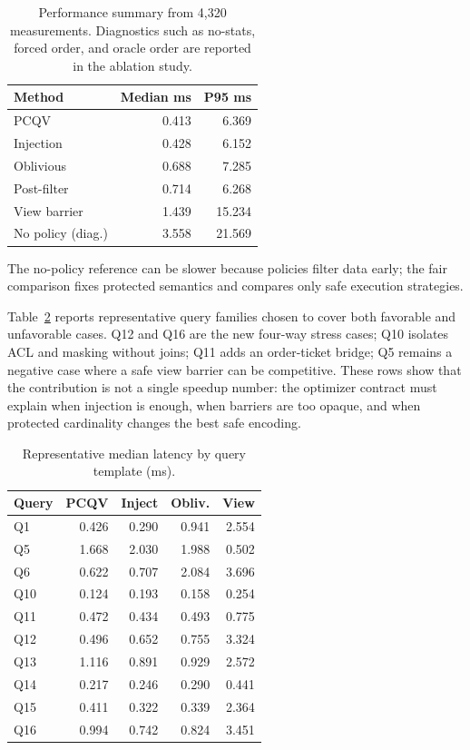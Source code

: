 \documentclass[conference]{IEEEtran}
\newcommand{\pcqv}{PCQV}
\begin{document}
\begin{table}[t]
\centering
\caption{Performance summary from 4,320 measurements. Diagnostics such as no-stats, forced order, and oracle order are reported in the ablation study.}
\label{tab:perf}
\begin{tabular}{lrr}
\toprule
Method & Median ms & P95 ms \\
\midrule
\pcqv{} & 0.413 & 6.369 \\
Injection & 0.428 & 6.152 \\
Oblivious & 0.688 & 7.285 \\
Post-filter & 0.714 & 6.268 \\
View barrier & 1.439 & 15.234 \\
No policy (diag.) & 3.558 & 21.569 \\
\bottomrule
\end{tabular}
\end{table}



The no-policy reference can be slower because policies filter data early; the fair comparison fixes protected semantics and compares only safe execution strategies.

Table~\ref{tab:byquery} reports representative query families chosen to cover both favorable and unfavorable cases. Q12 and Q16 are the new four-way stress cases; Q10 isolates ACL and masking without joins; Q11 adds an order-ticket bridge; Q5 remains a negative case where a safe view barrier can be competitive. These rows show that the contribution is not a single speedup number: the optimizer contract must explain when injection is enough, when barriers are too opaque, and when protected cardinality changes the best safe encoding.

\begin{table}[t]
\centering
\caption{Representative median latency by query template (ms).}
\label{tab:byquery}
\begin{tabular}{lrrrr}
\toprule
Query & \pcqv{} & Inject & Obliv. & View \\
\midrule
Q1 & 0.426 & 0.290 & 0.941 & 2.554 \\
Q5 & 1.668 & 2.030 & 1.988 & 0.502 \\
Q6 & 0.622 & 0.707 & 2.084 & 3.696 \\
Q10 & 0.124 & 0.193 & 0.158 & 0.254 \\
Q11 & 0.472 & 0.434 & 0.493 & 0.775 \\
Q12 & 0.496 & 0.652 & 0.755 & 3.324 \\
Q13 & 1.116 & 0.891 & 0.929 & 2.572 \\
Q14 & 0.217 & 0.246 & 0.290 & 0.441 \\
Q15 & 0.411 & 0.322 & 0.339 & 2.364 \\
Q16 & 0.994 & 0.742 & 0.824 & 3.451 \\
\bottomrule
\end{tabular}
\end{table}
\end{document}
